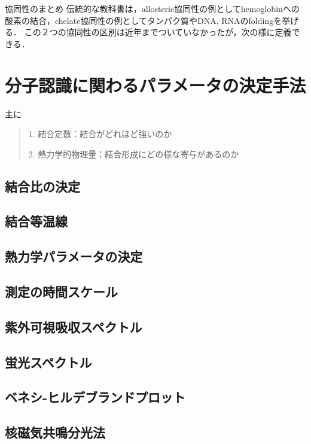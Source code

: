 \documentclass[uplatex, dvipdfmx]{jsreport}
\begin{document}
\begin{itembox}[l]{協同性のまとめ}
    伝統的な教科書は，allosteric協同性の例としてhemoglobinへの酸素の結合，chelate協同性の例としてタンパク質やDNA, RNAのfoldingを挙げる．
    この２つの協同性の区別は近年までついていなかったが，次の様に定義できる\cite{What is cooperativity?}．
\end{itembox}

\section{分子認識に関わるパラメータの決定手法}
主に
\begin{quotation}
    1. 結合定数：結合がどれほど強いのか

    2. 熱力学的物理量：結合形成にどの様な寄与があるのか
\end{quotation}

\subsection{結合比の決定}

\subsection{結合等温線}

\subsection{熱力学パラメータの決定}

\subsection{測定の時間スケール}

\subsection{紫外可視吸収スペクトル}

\subsection{蛍光スペクトル}

\subsection{ベネシ-ヒルデブランドプロット}

\subsection{核磁気共鳴分光法}
\end{document}
